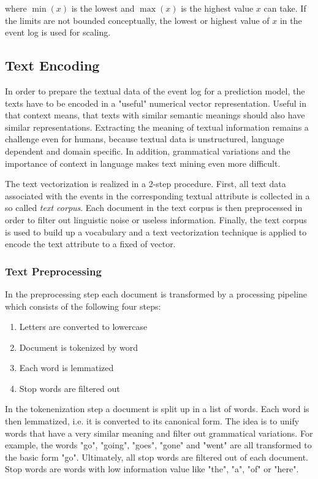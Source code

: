 where $\min(x)$ is the lowest and $\max(x)$ is the highest value $x$ can take.
If the limits are not bounded conceptually, the lowest or highest value of $x$ in the event log is used for scaling.

\subsection{Text Encoding}

In order to prepare the textual data of the event log for a prediction model, the texts have to be encoded in a "useful" numerical vector representation.
Useful in that context means, that texts with similar semantic meanings should also have similar representations.
Extracting the meaning of textual information remains a challenge even for humans, because textual data is unstructured, language dependent and domain specific.
In addition, grammatical variations and the importance of context in language makes text mining even more difficult.

The text vectorization is realized in a 2-step procedure.
First, all text data associated with the events in the corresponding textual attribute is collected in a so called \textit{text corpus}.
Each document in the text corpus is then preprocessed in order to filter out linguistic noise or useless information.
Finally, the text corpus is used to build up a vocabulary and a text vectorization technique is applied to encode the text attribute to a fixed of vector.

\subsubsection{Text Preprocessing}

In the preprocessing step each document is transformed by a processing pipeline which consists of the following four steps:

\begin{enumerate} 
	\item Letters are converted to lowercase
	\item Document is tokenized by word
	\item Each word is lemmatized
	\item Stop words are filtered out
\end{enumerate}

In the tokenenization step a document is split up in a list of words.
Each word is then lemmatized, i.e. it is converted to its canonical form.
The idea is to unify words that have a very similar meaning and filter out grammatical variations.
For example, the words  "go", "going", "goes", "gone" and "went" are all transformed to the basic form "go".
Ultimately, all stop words are filtered out of each document.
Stop words are words with low information value like "the", "a", "of" or "here".

